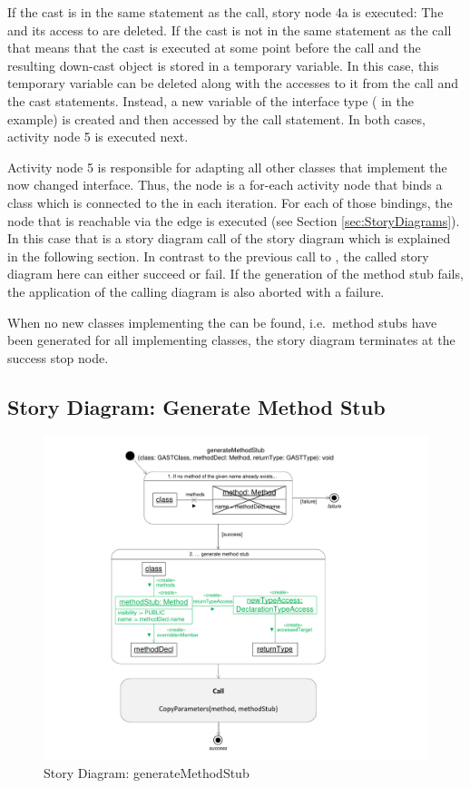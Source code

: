 If the cast is in the same statement as the call, story node 4a is executed: The  and its access to  are deleted. If the cast is not in the same statement as the call that means that the cast is executed at some point before the call and the resulting down-cast object is stored in a temporary variable. In this case, this temporary variable can be deleted along with the accesses to it from the call and the cast statements. Instead, a new variable of the interface type ( in the example) is created and then accessed by the call statement. In both cases, activity node 5 is executed next.

Activity node 5 is responsible for adapting all other classes that implement the now changed interface. Thus, the node is a for-each activity node that binds a class which is connected to the  in each iteration. For each of those bindings, the node that is reachable via the  edge is executed (see Section \ref{sec:StoryDiagrams}). In this case that is a story diagram call of the story diagram  which is explained in the following section. In contrast to the previous call to , the called story diagram here can either succeed or fail. If the generation of the method stub fails, the application of the calling diagram is also aborted with a failure.

When no new classes implementing the  can be found, i.e.\ method stubs have been generated for all implementing classes, the story diagram terminates at the success stop node.

\subsection{Story Diagram: Generate Method Stub}

\begin{figure}[hbtp]
\centering
\includegraphics[width=0.9\linewidth]{./figures/SDGenerateMethodStub}
\caption{Story Diagram: generateMethodStub}
\label{fig:SDGenerateMethodStub}
\end{figure}

